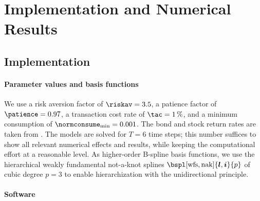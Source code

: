 \section{Implementation and Numerical Results}
\label{sec:84results}


\parbox{1em}{}
\vspace{-3em}



\printornamentsfalse
\subsection{Implementation}
\label{sec:841implementation}
\printornamentstrue

\paragraph{Parameter values and basis functions}

We use
a risk aversion factor of $\riskav = 3.5$,
a patience factor of $\patience = 0.97$,
a transaction cost rate of $\tac = \SI{1}{\percent}$, and
a minimum consumption of $\normconsume_{\min} = 0.001$.
The bond and stock return rates are taken from \cite{Cai10Stable}.
The models are solved for $T = 6$ time steps;
this number suffices to show all relevant numerical effects and results,
while keeping the computational effort at a reasonable level.
As higher-order B-spline basis functions,
we use the hierarchical weakly fundamental not-a-knot splines
$\bspl[\wfs,\nak]{\*l,\*i}{p}$ of cubic degree $p = 3$
to enable hierarchization with the unidirectional principle.

\vspace*{-0.5em}

\paragraph{Software}

